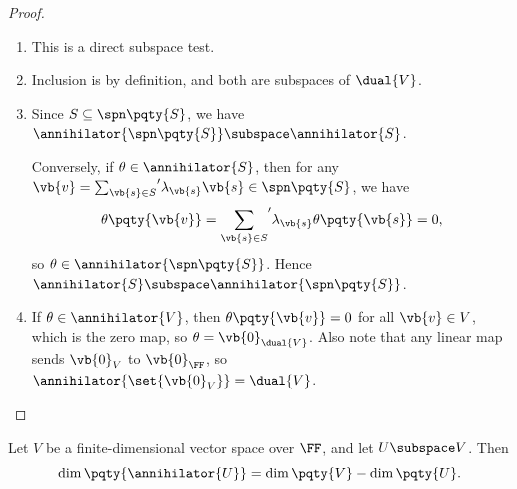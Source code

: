 \begin{proof}
    \begin{enumerate}
        \item This is a direct subspace test.
        \item Inclusion is by definition, and both are subspaces of \(\dual{V}\).
        \item Since \(S \subseteq \spn\pqty{S}\), we have \(\annihilator{\spn\pqty{S}} \subspace \annihilator{S}\).
        
        Conversely, if \(\theta \in \annihilator{S}\), then for any \(\vb{v} = {\sum_{\vb{s} \in S}}' \lambda_{\vb{s}} \vb{s} \in \spn\pqty{S}\), we have
        \[
            \theta\pqty{\vb{v}} = {\sum_{\vb{s} \in S}}' \lambda_{\vb{s}} \theta\pqty{\vb{s}} = 0,
        \]
        so \(\theta \in \annihilator{\spn\pqty{S}}\). Hence \(\annihilator{S} \subspace \annihilator{\spn\pqty{S}}\).
        \item If \(\theta \in \annihilator{V}\), then \(\theta\pqty{\vb{v}} = 0\) for all \(\vb{v} \in V\), which is the zero map, so \(\theta = \vb{0}_{\dual{V}}\). Also note that any linear map sends \(\vb{0}_V\) to \(\vb{0}_{\FF}\), so \(\annihilator{\set{\vb{0}_V}} = \dual{V}\).
    \end{enumerate}
\end{proof}

\begin{proposition}
    \label{prop:dimension-of-annihilator}%
    Let \(V\) be a finite-dimensional vector space over \(\FF\), and let \(U \subspace V\). Then
    \[
        \dim \pqty{\annihilator{U}} = \dim \pqty{V} - \dim \pqty{U}.
    \]
\end{proposition}

